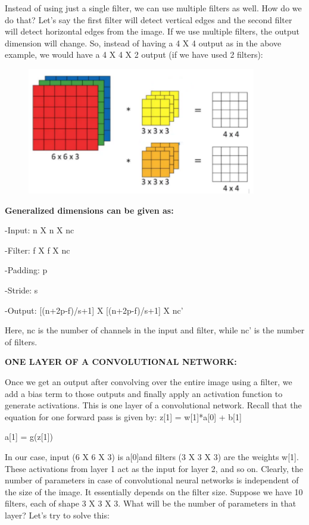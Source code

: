 \documentclass[a4paper]{article}
\begin{document}
Instead of using just a single filter, we can use multiple filters as well. How do we do that? Let’s say the first filter will detect vertical edges and the second filter will detect horizontal edges from the image. If we use multiple filters, the output dimension will change. So, instead of having a 4 X 4 output as in the above example, we would have a 4 X 4 X 2 output (if we have used 2 filters): 

{
\begin{figure}[htp]
    \centering
    \includegraphics[width=10cm]{F_Volume.png}
\end{figure}
}

\textbf{Generalized dimensions can be given as:}

    -Input: n X n X nc
    
    -Filter: f X f X nc
    
    -Padding: p
    
    -Stride: s
    
    -Output: [(n+2p-f)/s+1] X [(n+2p-f)/s+1] X nc’

Here, nc is the number of channels in the input and filter, while nc’ is the number of filters. 


\textbf{ONE LAYER OF A CONVOLUTIONAL NETWORK:}

Once we get an output after convolving over the entire image using a filter, we add a bias term to those outputs and finally apply an activation function to generate activations. This is one layer of a convolutional network. Recall that the equation for one forward pass is given by: 
z[1] = w[1]*a[0] + b[1]

a[1] = g(z[1]) 

In our case, input (6 X 6 X 3) is a[0]and filters (3 X 3 X 3) are the weights w[1]. These activations from layer 1 act as the input for layer 2, and so on. Clearly, the number of parameters in case of convolutional neural networks is independent of the size of the image. It essentially depends on the filter size. Suppose we have 10 filters, each of shape 3 X 3 X 3. What will be the number of parameters in that layer? Let’s try to solve this: 
\end{document}
